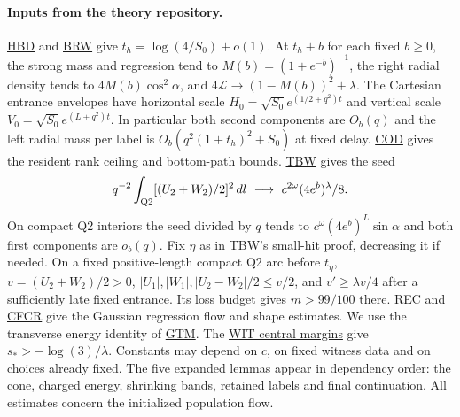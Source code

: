 \documentclass[11pt]{article}
\newcommand{\dd}{\,dl}
\newcommand{\Ll}{\mathcal L}
\newcommand{\repo}{https://github.com/TodManlaibaatar/OOD-reversals-theory/blob/12aa3b6f48f83a097600bcf9b44d93399e2f9697}
\newcommand{\src}[2]{\href{\repo/09_canonical_regime_AN04/AN04_#1_v1.tex}{#2}}
\begin{document}
\paragraph{Inputs from the theory repository.}
\src{trained_half_mass_bridge_donors}{HBD} and \src{bridge_return_before_weak_learning}{BRW}
give $t_h=\log(4/S_0)+o(1)$. At $t_h+b$ for each fixed $b\ge0$, the strong mass and regression tend to $M(b)=(1+e^{-b})^{-1}$, the right radial density tends to $4M(b)\cos^2\alpha$, and $4\Ll\to (1-M(b))^2+\lambda$. The Cartesian entrance envelopes have horizontal scale $H_0=\sqrt{S_0}e^{(1/2+q^2)t}$ and vertical scale $V_0=\sqrt{S_0}e^{(L+q^2)t}$. In particular both second components are $O_b(q)$ and the left radial mass per label is $O_b(q^2(1+t_h)^2+S_0)$ at fixed delay.
\src{core_output_descent}{COD} gives the resident rank ceiling and bottom-path bounds.
\src{transverse_balance_and_weak_clock}{TBW} gives the seed
\[
 q^{-2}\int_{\rm Q2}[(U_2+W_2)/2]^2\dd\ \longrightarrow\ c^{2\omega}(4e^b)^\lambda/8 .
\]
On compact Q2 interiors the seed divided by $q$ tends to $c^\omega(4e^b)^L\sin\alpha$ and both first components are $o_b(q)$. Fix $\eta$ as in TBW's small-hit proof, decreasing it if needed. On a fixed positive-length compact Q2 arc before $t_\eta$, $v=(U_2+W_2)/2>0$, $|U_1|,|W_1|,|U_2-W_2|/2\le v/2$, and $v'\ge\lambda v/4$ after a sufficiently late fixed entrance. Its loss budget gives $m>99/100$ there.
\src{residual_exchange_channels}{REC} and \src{cap_free_cross_response}{CFCR} give the Gaussian regression flow and shape estimates. We use the transverse energy identity of \src{gate_transport_and_transverse_memory}{GTM}. The \href{\repo/04_witnesses_persistence/AN06_learned_orbit_witnesses_v2.tex}{WIT central margins} give $s_*>-\log(3)/\lambda$. Constants may depend on $c$, on fixed witness data and on choices already fixed. The five expanded lemmas appear in dependency order: the cone, charged energy, shrinking bands, retained labels and final continuation. All estimates concern the initialized population flow.
\end{document}
